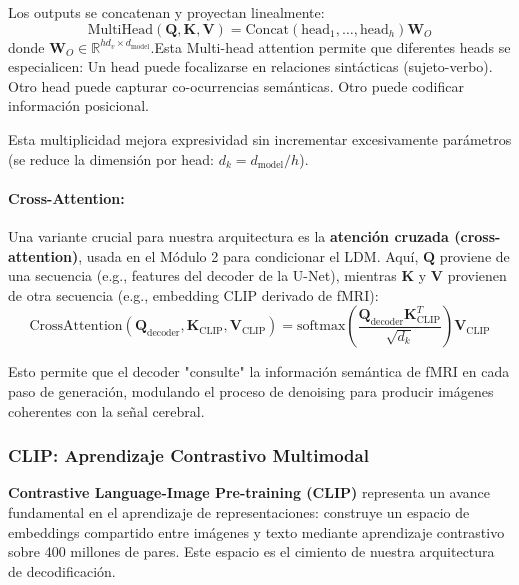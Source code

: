 \documentclass{article}
\begin{document}
Los outputs se concatenan y proyectan linealmente:
\begin{equation}
\text{MultiHead}(\mathbf{Q}, \mathbf{K}, \mathbf{V}) = \text{Concat}(\text{head}_1, \ldots, \text{head}_h) \mathbf{W}_O
\end{equation}
donde $\mathbf{W}_O \in \mathbb{R}^{h d_v \times d_{\text{model}}}$.Esta Multi-head attention permite que diferentes heads se especialicen:
 Un head puede focalizarse en relaciones sintácticas (sujeto-verbo).
     Otro head puede capturar co-ocurrencias semánticas.
     Otro puede codificar información posicional.

Esta multiplicidad mejora expresividad sin incrementar excesivamente parámetros (se reduce la dimensión por head: $d_k = d_{\text{model}}/h$).

\paragraph{Cross-Attention:\cite{15}} 
Una variante crucial para nuestra arquitectura es la \textbf{atención cruzada (cross-attention)}, usada en el Módulo 2 para condicionar el LDM. Aquí, $\mathbf{Q}$ proviene de una secuencia (e.g., features del decoder de la U-Net), mientras $\mathbf{K}$ y $\mathbf{V}$ provienen de otra secuencia (e.g., embedding CLIP derivado de fMRI):
\begin{equation}
\text{CrossAttention}(\mathbf{Q}_{\text{decoder}}, \mathbf{K}_{\text{CLIP}}, \mathbf{V}_{\text{CLIP}}) = \text{softmax}\left(\frac{\mathbf{Q}_{\text{decoder}} \mathbf{K}_{\text{CLIP}}^T}{\sqrt{d_k}}\right) \mathbf{V}_{\text{CLIP}}
\end{equation}

Esto permite que el decoder "consulte" la información semántica de fMRI en cada paso de generación, modulando el proceso de denoising para producir imágenes coherentes con la señal cerebral.

\subsubsection{CLIP: Aprendizaje Contrastivo Multimodal}

\textbf{Contrastive Language-Image Pre-training (CLIP)} \cite{15} representa un avance fundamental en el aprendizaje de representaciones: construye un espacio de embeddings compartido entre imágenes y texto mediante aprendizaje contrastivo sobre 400 millones de pares. Este espacio es el cimiento de nuestra arquitectura de decodificación.
\end{document}
